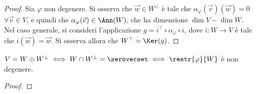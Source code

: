 \documentclass[11pt]{article}
\begin{document}
	\begin{proof}
		
		Sia $\varphi$ non degenere.
		Si osserva che $\vec w \in W^\perp$ è tale che
		$\alpha_\varphi(\vec v)(\vec w) = 0$ $\forall \vec v \in V$,
		e quindi che $\alpha_\varphi(\vec v) \in \Ann(W)$, che
		ha dimensione $\dim V - \dim W$. \\
		
		Nel caso generale, si consideri l'applicazione
		$g = i^\top \circ \alpha_\varphi \circ i$, dove
		$i : W \to V$ è tale che $i(\vec w) = \vec w$.
		Si osserva allora che $W^\top = \Ker (g)$.
		
	\end{proof}

	\begin{proposition}
		$V = W \oplus W^\perp \iff W \cap W^\perp = \zerovecset \iff \restr{\varphi}{W}$ è non degenere.
	\end{proposition}

	\begin{proof}
	\end{proof}

	
	
\end{document}
